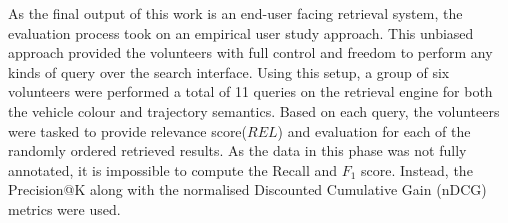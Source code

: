 As the final output of this work is an end-user facing retrieval system, the evaluation process took on an empirical user study approach. This unbiased approach provided the volunteers with full control and freedom to perform any kinds of query over the search interface.
Using this setup, a group of six volunteers were performed a total of 11 queries on the retrieval engine for both the vehicle colour and trajectory semantics.
Based on each query, the volunteers were tasked to provide relevance score($REL$) and evaluation for each of the randomly ordered retrieved results.
As the data in this phase was not fully annotated, it is impossible to compute the Recall and $F_1$ score. Instead, the Precision@K along with the normalised Discounted Cumulative Gain (nDCG) metrics were used.

